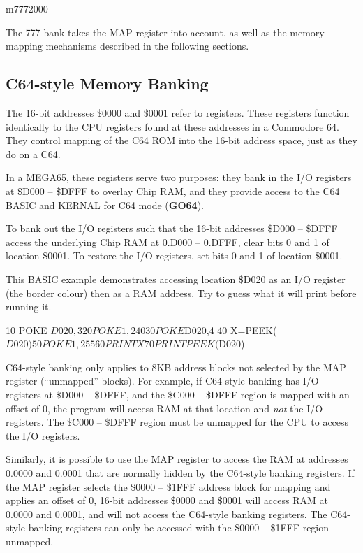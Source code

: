 \begin{basiccode}
m7772000
\end{basiccode}

The 777 bank takes the MAP register into account, as well as the memory mapping mechanisms described in the following sections.

\subsection{C64-style Memory Banking}

The 16-bit addresses \$0000 and \$0001 refer to registers. These registers function identically to the CPU registers found at these addresses in a Commodore 64. They control mapping of the C64 ROM into the 16-bit address space, just as they do on a C64.

In a MEGA65, these registers serve two purposes: they bank in the I/O registers at \$D000 -- \$DFFF to overlay Chip RAM, and they provide access to the C64 BASIC and KERNAL for C64 mode (\textbf{GO64}).

To bank out the I/O registers such that the 16-bit addresses \$D000 -- \$DFFF access the underlying Chip RAM at 0.D000 -- 0.DFFF, clear bits 0 and 1 of location \$0001. To restore the I/O registers, set bits 0 and 1 of location \$0001.

This BASIC example demonstrates accessing location \$D020 as an I/O register
(the border colour) then as a RAM address. Try to guess what it will print
before running it.

\begin{basiccode}
10 POKE $D020,3
20 POKE 1,240
30 POKE $D020,4
40 X=PEEK($D020)
50 POKE 1,255
60 PRINT X
70 PRINT PEEK($D020)
\end{basiccode}

C64-style banking only applies to 8KB address blocks not selected by the MAP register (``unmapped'' blocks). For example, if C64-style banking has I/O registers at \$D000 -- \$DFFF, and the \$C000 -- \$DFFF region is mapped with an offset of 0, the program will access RAM at that location and {\em not} the I/O registers. The \$C000 -- \$DFFF region must be unmapped for the CPU to access the I/O registers.

Similarly, it is possible to use the MAP register to access the RAM at addresses 0.0000 and 0.0001 that are normally hidden by the C64-style banking registers. If the MAP register selects the \$0000 -- \$1FFF address block for mapping and applies an offset of 0, 16-bit addresses \$0000 and \$0001 will access RAM at 0.0000 and 0.0001, and will not access the C64-style banking registers. The C64-style banking registers can only be accessed with the \$0000 -- \$1FFF region unmapped.

